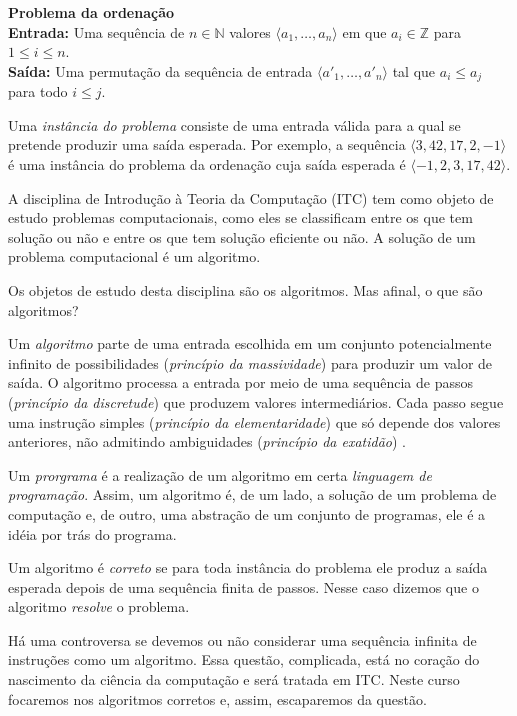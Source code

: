 \begin{example}
  {\bf Problema da ordenação}\\

  {\bf Entrada:} Uma sequência de $n \in \mathbb{N}$ valores $\langle a_1, \dots, a_n \rangle$ em que $a_i \in \mathbb{Z}$ para $1 \leq i \leq n$.\\

  {\bf Saída:} Uma permutação da sequência de entrada $\langle a'_1, \dots, a'_n \rangle$ tal que $a_i \leq a_j$ para todo $i \leq j$.
\end{example}

Uma {\em instância do problema} consiste de uma entrada válida para a qual se pretende produzir uma saída esperada.
Por exemplo, a sequência $\langle 3, 42, 17, 2, -1 \rangle$ é uma instância do problema da ordenação cuja saída esperada é $\langle -1, 2, 3, 17, 42 \rangle$.

A disciplina de Introdução à Teoria da Computação (ITC) tem como objeto de estudo problemas computacionais, como eles se classificam entre os que tem solução ou não e entre os que tem solução eficiente ou não.
A solução de um problema computacional é um algoritmo.

Os objetos de estudo desta disciplina são os algoritmos.
Mas afinal, o que são algoritmos?

Um {\em algoritmo} parte de uma entrada escolhida em um conjunto potencialmente infinito de possibilidades ({\em princípio da massividade}) para produzir um valor de saída.
O algoritmo processa a entrada por meio de uma sequência de passos ({\em princípio da discretude}) que produzem valores intermediários.
Cada passo  segue uma instrução simples ({\em princípio da elementaridade}) que só depende dos valores anteriores, não admitindo ambiguidades ({\em princípio da exatidão}) \cite{malcev70}.

Um {\em prorgrama} é a realização de um algoritmo em certa {\em linguagem de programação}.
Assim, um algoritmo é, de um lado, a solução de um problema de computação e, de outro, uma abstração de um conjunto de programas, ele é a idéia por trás do programa.

Um algoritmo é {\em correto} se para toda instância do problema ele produz a saída esperada depois de uma sequência finita de passos.
Nesse caso dizemos que o algoritmo {\em resolve} o problema.

Há uma controversa se devemos ou não considerar uma sequência infinita de instruções como um algoritmo.
Essa questão, complicada, está no coração do nascimento da ciência da computação e será tratada em ITC.
Neste curso focaremos nos algoritmos corretos e, assim, escaparemos da questão.

